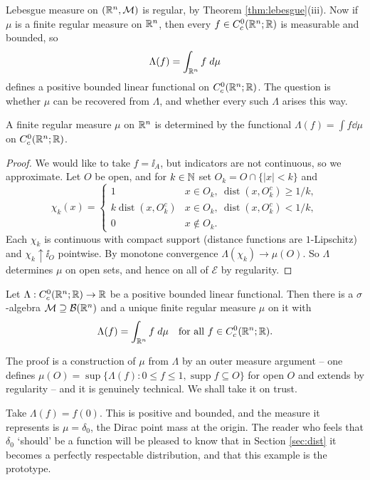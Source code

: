 \documentclass[a4paper]{scrartcl}
\DeclareMathOperator{\supp}{supp}
\DeclareMathOperator{\dist}{dist}
\begin{document}
Lebesgue measure on $(\mathbb{R}^n, \mathcal{M})$ is regular, by Theorem \ref{thm:lebesgue}(iii). Now if $\mu$ is a finite regular measure on $\mathbb{R}^n$, then every $f \in C^0_c(\mathbb{R}^n;\mathbb{R})$ is measurable and bounded, so
$$\Lambda(f) = \int_{\mathbb{R}^n} f \; d \mu$$
defines a positive bounded linear functional on $C^0_c(\mathbb{R}^n;\mathbb{R})$. The question is whether $\mu$ can be recovered from $\Lambda$, and whether every such $\Lambda$ arises this way.

\begin{lemma}\label{lem:measuredetermined}
	A finite regular measure $\mu$ on $\mathbb{R}^n$ is determined by the functional $\Lambda(f) = \int f \dd\mu$ on $C_c^0(\mathbb{R}^n;\mathbb{R})$.
\end{lemma}

\begin{proof}
	We would like to take $f = \ii_A$, but indicators are not continuous, so we approximate. Let $O$ be open, and for $k \in \mathbb{N}$ set $O_k = O \cap \{|x| < k\}$ and
	$$\chi_k(x) = \begin{cases} 1 & x \in O_k, \ \dist(x, O_k^c) \ge 1/k, \\ k\dist(x, O_k^c) & x \in O_k, \ \dist(x,O_k^c) < 1/k, \\ 0 & x \notin O_k.\end{cases}$$
	Each $\chi_k$ is continuous with compact support (distance functions are $1$-Lipschitz) and $\chi_k \uparrow \ii_O$ pointwise. By monotone convergence $\Lambda(\chi_k) \to \mu(O)$. So $\Lambda$ determines $\mu$ on open sets, and hence on all of $\mathcal{E}$ by regularity.
\end{proof}

\begin{theorem}\label{thm:rieszmarkov}
	Let $\Lambda : C_c^0(\mathbb{R}^n;\mathbb{R}) \to \mathbb{R}$ be a positive bounded linear functional. Then there is a $\sigma$-algebra $\mathcal{M} \supseteq \mathcal{B}(\mathbb{R}^n)$ and a unique finite regular measure $\mu$ on it with
	$$\Lambda(f) = \int_{\mathbb{R}^n} f \; d \mu \quad \text{for all } f \in C_c^0(\mathbb{R}^n;\mathbb{R}).$$
\end{theorem}

The proof is a construction of $\mu$ from $\Lambda$ by an outer measure argument -- one defines $\mu(O) = \sup\{\Lambda(f) : 0 \le f \le 1, \supp f \subseteq O\}$ for open $O$ and extends by regularity -- and it is genuinely technical. We shall take it on trust.

\begin{example}
	Take $\Lambda(f) = f(0)$. This is positive and bounded, and the measure it represents is $\mu = \delta_0$, the Dirac point mass at the origin. The reader who feels that $\delta_0$ `should' be a function will be pleased to know that in Section \ref{sec:dist} it becomes a perfectly respectable distribution, and that this example is the prototype.
\end{example}
\end{document}

